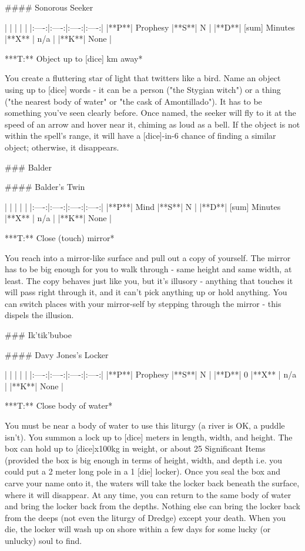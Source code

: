 #### Sonorous Seeker

| | | | |
|:----:|:----:|:----:|:----:|
|**P**| Prophesy |**S**|  N |
|**D**| [sum] Minutes |**X** |  n/a  |
|**K**| None |


***T:**   Object up to [dice] km away*



You create a fluttering star of light that twitters like a bird.  Name an object using up to [dice] words - it can be a person ("the Stygian witch") or a thing ("the nearest body of water" or "the cask of Amontillado").  It has to be something you've seen clearly before.  Once named, the seeker will fly to it at the speed of an arrow and hover near it, chiming as loud as a bell.  If the object is not within the spell's range, it will have a [dice]-in-6 chance of finding a similar object; otherwise, it disappears.




### Balder





#### Balder's Twin

| | | | |
|:----:|:----:|:----:|:----:|
|**P**| Mind |**S**|  N |
|**D**| [sum] Minutes |**X** |  n/a  |
|**K**| None |


***T:**   Close (touch) mirror*



You reach into a mirror-like surface and pull out a copy of yourself.  The mirror has to be big enough for you to walk through - same height and same width, at least.  The copy behaves just like you, but it's illusory - anything that touches it will pass right through it, and it can't pick anything up or hold anything.  You can switch places with your mirror-self by stepping through the mirror - this dispels the illusion.


### Ik'tik'buboe





#### Davy Jones's Locker

| | | | |
|:----:|:----:|:----:|:----:|
|**P**| Prophesy |**S**|  N |
|**D**| 0 |**X** |  n/a  |
|**K**| None |


***T:**   Close body of water*



You must be near a body of water to use this liturgy (a river is OK, a puddle isn't).  You summon a lock up to [dice] meters in length, width, and height.  The box can hold up to [dice]x100kg in weight, or about 25 Significant Items (provided the box is big enough in terms of height, width, and depth i.e. you could put a 2 meter long pole in a 1 [die] locker).  Once you seal the box and carve your name onto it, the waters will take the locker back beneath the surface, where it will disappear.  At any time, you can return to the same body of water and bring the locker back from the depths. Nothing else can bring the locker back from the deeps (not even the liturgy of Dredge) except your death.  When you die, the locker will wash up on shore within a few days for some lucky (or unlucky) soul to find.


